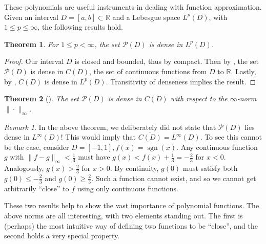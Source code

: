 \documentclass[11pt]{report}
\newtheorem{theorem}{Theorem}
\theoremstyle{definition}
\theoremstyle{remark}
\newtheorem*{remark}{Remark}
\newcommand{\R}{\mathbb{R}}
\renewcommand{\P}{\mathcal{P}}
\newcommand{\sgn}{\operatorname{sgn}}
\begin{document}
These polynomials are useful instruments in dealing with function approximation. Given an interval $D = [a,b] \subset \R$ and a Lebesgue space $L^p(D)$, with $1 \leq p \leq \infty$, the following results hold.
\begin{theorem}
  For $1 \leq p < \infty$, the set $\P(D)$ is dense in $L^p(D)$.
\end{theorem}
\begin{proof}
  Our interval $D$ is closed and bounded, thus by \cite[Thm.~1.35]{RY} compact. Then by \cite[Thm.~1.40]{RY}, the set $\P(D)$ is dense in $C(D)$, the set of continuous functions from $D$ to $\R$. Lastly, by \cite[Thm.~1.62]{RY}, $C(D)$ is dense in $L^p(D)$. Transitivity of denseness implies the result.
\end{proof}
\begin{theorem}[{\cite[Thm.~8.1]{NA}}]
  \label{thm:weierstrass}
  The set $\P(D)$ is dense in $C(D)$ with respect to the $\infty$-norm $\|\cdot\|_\infty$.
\end{theorem}
\begin{remark}
  In the above theorem, we deliberately did not state that $\P(D)$ lies dense in $L^\infty(D)$! This would imply that $\overline{C(D)} = L^\infty(D)$. To see this cannot be the case, consider $D = [-1,1], f(x) = \sgn(x)$. Any continuous function $g$ with $\|f - g\|_\infty < \frac{1}{3}$ must have $g(x) < f(x) + \frac{1}{3} = -\frac{2}{3}$ for $x < 0$. Analogously, $g(x) > \frac{2}{3}$ for $x > 0$. By continuity, $g(0)$ must satisfy both $g(0) \leq -\frac{2}{3}$ and $g(0) \geq \frac{2}{3}$. Such a function cannot exist, and so we cannot get arbitrarily ``close'' to $f$ using only continuous functions.
\end{remark}

These two results help to show the vast importance of polynomial functions. The above norms are all interesting, with two elements standing out. The first is (perhaps) the most intuitive way of defining two functions to be ``close'', and the second holds a very special property.
\end{document}
